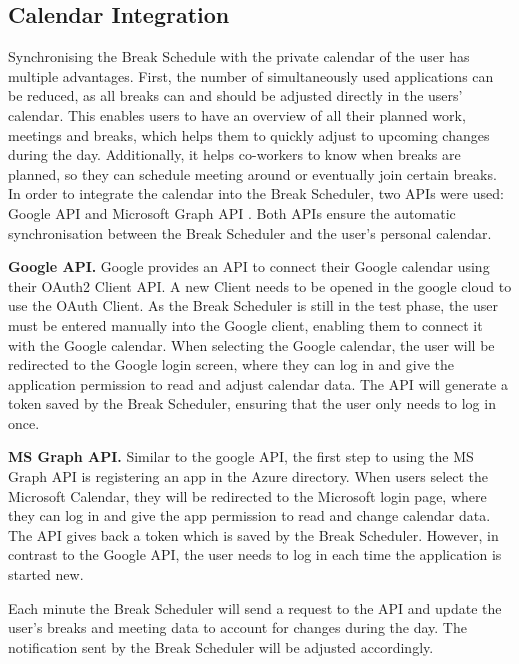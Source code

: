 \documentclass{hasel_thesis}
\begin{document}
\subsection{Calendar Integration} \label{calendar_integration}

Synchronising the Break Schedule with the private calendar of the user has multiple advantages. First, the number of simultaneously used applications can be reduced, as all breaks can and should be adjusted directly in the users' calendar. This enables users to have an overview of all their planned work, meetings and breaks, which helps them to quickly adjust to upcoming changes during the day. Additionally, it helps co-workers to know when breaks are planned, so they can schedule meeting around or eventually join certain breaks. In order to integrate the calendar into the Break Scheduler, two APIs were used: Google API \cite{googleAPI} and Microsoft Graph API \cite{graphAPI}. Both APIs ensure the automatic synchronisation between the Break Scheduler and the user's personal calendar. 

\textbf{Google API.} Google provides an API to connect their Google calendar using their OAuth2 Client API. A new Client needs to be opened in the google cloud to use the OAuth Client. As the Break Scheduler is still in the test phase, the user must be entered manually into the Google client, enabling them to connect it with the Google calendar. When selecting the Google calendar, the user will be redirected to the Google login screen, where they can log in and give the application permission to read and adjust calendar data. The API will generate a token saved by the Break Scheduler, ensuring that the user only needs to log in once.

\textbf{MS Graph API.} Similar to the google API, the first step to using the MS Graph API is registering an app in the Azure directory. When users select the Microsoft Calendar, they will be redirected to the Microsoft login page, where they can log in and give the app permission to read and change calendar data. The API gives back a token which is saved by the Break Scheduler. However, in contrast to the Google API, the user needs to log in each time the application is started new.

Each minute the Break Scheduler will send a request to the API and update the user's breaks and meeting data to account for changes during the day. The notification sent by the Break Scheduler will be adjusted accordingly.
\end{document}

